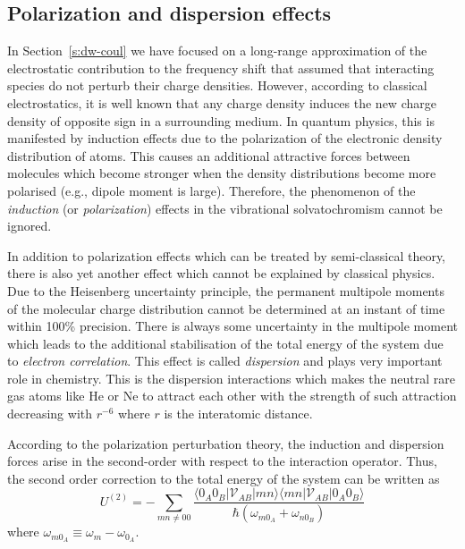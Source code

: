 \documentclass[a4paper,titlepage,twoside,fleqn,12pt]{book}
\begin{document}
\begin{refsection}
\subsection{Polarization and dispersion effects\label{s:dw-poldisp}}

In Section~\ref{s:dw-coul} we have focused on a long\hyp{}range
approximation of the electrostatic contribution to the frequency
shift that assumed that interacting species do not perturb
their charge densities. However, according to classical electrostatics,
it is well known that any charge density induces the new
charge density of opposite sign in a surrounding medium. In quantum
physics, this is manifested by induction effects due to the polarization
of the electronic density distribution of atoms. This causes
an additional attractive forces between molecules which
become stronger when the density distributions become more polarised
(e.g., dipole moment is large). Therefore, the
phenomenon of the \emph{induction} (or \emph{polarization}) effects
in the vibrational solvatochromism cannot be ignored.

In addition to polarization effects which can be treated
by semi\hyp{}classical theory, there is also yet another effect
which cannot be explained by classical physics. Due to the Heisenberg
uncertainty principle, the permanent multipole moments of the 
molecular charge distribution cannot be determined at an instant
of time within 100\% precision. There is always some uncertainty
in the multipole moment which leads to the additional stabilisation
of the total energy of the system due to \emph{electron correlation}. This effect is
called \emph{dispersion} and plays very important role in chemistry.
This is the dispersion interactions which makes the neutral rare gas atoms 
like He or Ne
to attract each other with the strength of such attraction decreasing
with $r^{-6}$ where $r$ is the interatomic distance.

According to the polarization perturbation theory, the induction
and dispersion forces arise in the second\hyp{}order with respect to
the interaction 
operator. \citep{Stone.TheTheoryOfIntermolecularForces.1996,
Jeziorski.Moszynski.Szalewicz.ChemRev.1994} 
Thus, the second order correction to the total
energy of the system can be written as
%
\begin{equation} \label{e:eint-2}
U^{(2)} = - \sum_{mn\ne 00} \frac{
\langle 0_A0_B \lvert \mathscr{V}_{AB} \rvert mn \rangle \langle  mn \lvert \mathscr{V}_{AB} \rvert 0_A0_B \rangle
}{\hbar \left( \omega_{m0_A} + \omega_{n0_B}\right)}
\end{equation}
%
where $\omega_{m0_A} \equiv \omega_{m} - \omega_{0_A}$.


\end{refsection}
\end{document}
